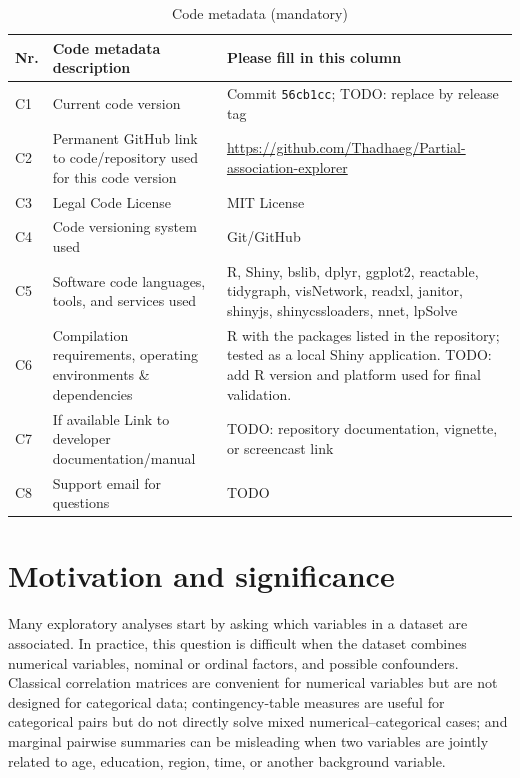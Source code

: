 \documentclass[preprint,12pt,a4paper]{elsarticle}
\numberwithin{equation}{section}
\begin{document}
\begin{table}[!h]
\begin{tabular}{|l|p{6.5cm}|p{6.5cm}|}
\hline
\textbf{Nr.} & \textbf{Code metadata description} & \textbf{Please fill in this column} \\
\hline
C1 & Current code version & Commit \texttt{56cb1cc}; TODO: replace by release tag \\
\hline
C2 & Permanent GitHub link to code/repository used for this code version & \url{https://github.com/Thadhaeg/Partial-association-explorer} \\
\hline
C3 & Legal Code License & MIT License \\
\hline
C4 & Code versioning system used & Git/GitHub \\
\hline
C5 & Software code languages, tools, and services used & R, Shiny, bslib, dplyr, ggplot2, reactable, tidygraph, visNetwork, readxl, janitor, shinyjs, shinycssloaders, nnet, lpSolve \\
\hline
C6 & Compilation requirements, operating environments \& dependencies & R with the packages listed in the repository; tested as a local Shiny application. TODO: add R version and platform used for final validation. \\
\hline
C7 & If available Link to developer documentation/manual & TODO: repository documentation, vignette, or screencast link \\
\hline
C8 & Support email for questions & TODO \\
\hline
\end{tabular}
\caption{Code metadata (mandatory)}
\label{tab:code-metadata}
\end{table}

\section{Motivation and significance}

Many exploratory analyses start by asking which variables in a dataset are associated. In practice, this question is difficult when the dataset combines numerical variables, nominal or ordinal factors, and possible confounders. Classical correlation matrices are convenient for numerical variables but are not designed for categorical data; contingency-table measures are useful for categorical pairs but do not directly solve mixed numerical--categorical cases; and marginal pairwise summaries can be misleading when two variables are jointly related to age, education, region, time, or another background variable.
\end{document}
